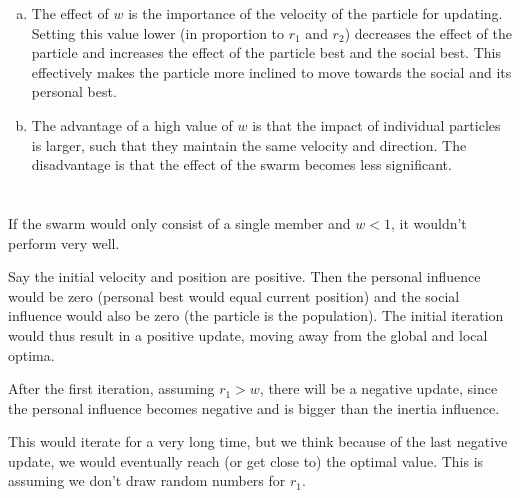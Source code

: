 \documentclass[11pt]{article}
\begin{document}
\begin{enumerate}[(a)]
\item The effect of $w$ is the importance of the velocity of the particle for updating. Setting this value lower (in proportion to $r_1$ and $r_2$) decreases the effect of the particle and increases the effect of the particle best and the social best. This effectively makes the particle more inclined to move towards the social and its personal best.

\item The advantage of a high value of $w$ is that the impact of individual particles is larger, such that they maintain the same velocity and direction. The disadvantage is that the effect of the swarm becomes less significant.
\end{enumerate}


\section{}
If the swarm would only consist of a single member and $w < 1$, it wouldn't perform very well. 

Say the initial velocity and position are positive. Then the personal influence would be zero (personal best would equal current position) and the social influence would also be zero (the particle is the population). The initial iteration would thus result in a positive update, moving away from the global and local optima. 

After the first iteration, assuming $r_1 > w$, there will be a negative update, since the personal influence becomes negative and is bigger than the inertia influence.

This would iterate for a very long time, but we think because of the last negative update, we would eventually reach (or get close to) the optimal value. This is assuming we don't draw random numbers for $r_1$.
\end{document}

